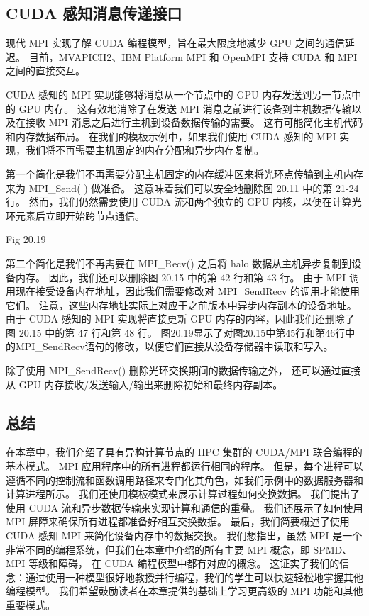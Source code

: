 \subsection{CUDA 感知消息传递接口}
现代 MPI 实现了解 CUDA 编程模型，旨在最大限度地减少 GPU 之间的通信延迟。 
目前，MVAPICH2、IBM Platform MPI 和 OpenMPI 支持 CUDA 和 MPI 之间的直接交互。

CUDA 感知的 MPI 实现能够将消息从一个节点中的 GPU 内存发送到另一节点中的 GPU 内存。 
这有效地消除了在发送 MPI 消息之前进行设备到主机数据传输以及在接收 MPI 消息之后进行主机到设备数据传输的需要。 
这有可能简化主机代码和内存数据布局。 
在我们的模板示例中，如果我们使用 CUDA 感知的 MPI 实现，我们将不再需要主机固定的内存分配和异步内存复制。

第一个简化是我们不再需要分配主机固定的内存缓冲区来将光环点传输到主机内存来为 MPI\_Send( ) 做准备。 
这意味着我们可以安全地删除图 20.11 中的第 21-24 行。 
然而，我们仍然需要使用 CUDA 流和两个独立的 GPU 内核，以便在计算光环元素后立即开始跨节点通信。

{\color{red} Fig 20.19}

第二个简化是我们不再需要在 MPI\_Recv() 之后将 halo 数据从主机异步复制到设备内存。 
因此，我们还可以删除图 20.15 中的第 42 行和第 43 行。 
由于 MPI 调用现在接受设备内存地址，因此我们需要修改对 MPI\_SendRecv 的调用才能使用它们。 
注意，这些内存地址实际上对应于之前版本中异步内存副本的设备地址。 
由于 CUDA 感知的 MPI 实现将直接更新 GPU 内存的内容，因此我们还删除了图 20.15 中的第 47 行和第 48 行。 
图20.19显示了对图20.15中第45行和第46行中的MPI\_SendRecv语句的修改，以便它们直接从设备存储器中读取和写入。

除了使用 MPI\_SendRecv() 删除光环交换期间的数据传输之外，
还可以通过直接从 GPU 内存接收/发送输入/输出来删除初始和最终内存副本。

\subsection{总结}
在本章中，我们介绍了具有异构计算节点的 HPC 集群的 CUDA/MPI 联合编程的基本模式。 
MPI 应用程序中的所有进程都运行相同的程序。 
但是，每个进程可以遵循不同的控制流和函数调用路径来专门化其角色，如我们示例中的数据服务器和计算进程所示。 
我们还使用模板模式来展示计算过程如何交换数据。 我们提出了使用 CUDA 流和异步数据传输来实现计算和通信的重叠。 
我们还展示了如何使用 MPI 屏障来确保所有进程都准备好相互交换数据。 
最后，我们简要概述了使用 CUDA 感知 MPI 来简化设备内存中的数据交换。 
我们想指出，虽然 MPI 是一个非常不同的编程系统，但我们在本章中介绍的所有主要 MPI 概念，即 SPMD、MPI 等级和障碍，
在 CUDA 编程模型中都有对应的概念。 
这证实了我们的信念：通过使用一种模型很好地教授并行编程，我们的学生可以快速轻松地掌握其他编程模型。 
我们希望鼓励读者在本章提供的基础上学习更高级的 MPI 功能和其他重要模式。